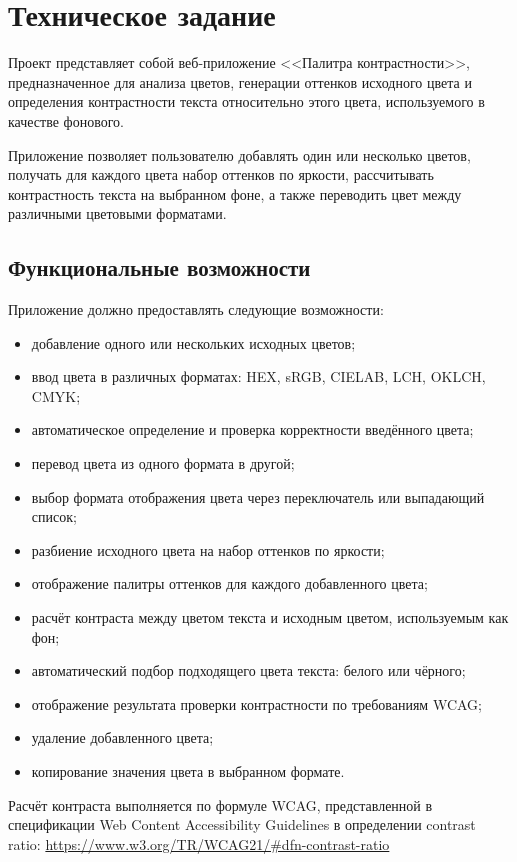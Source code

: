 \section{Техническое задание}

Проект представляет собой веб-приложение <<Палитра контрастности>>, предназначенное для анализа цветов, генерации оттенков исходного цвета и определения контрастности текста относительно этого цвета, используемого в качестве фонового.

Приложение позволяет пользователю добавлять один или несколько цветов, получать для каждого цвета набор оттенков по яркости, рассчитывать контрастность текста на выбранном фоне, а также переводить цвет между различными цветовыми форматами.

\subsection*{Функциональные возможности}

Приложение должно предоставлять следующие возможности:

\begin{itemize}
    \item добавление одного или нескольких исходных цветов;
    \item ввод цвета в различных форматах: HEX, sRGB, CIELAB, LCH, OKLCH, CMYK;
    \item автоматическое определение и проверка корректности введённого цвета;
    \item перевод цвета из одного формата в другой;
    \item выбор формата отображения цвета через переключатель или выпадающий список;
    \item разбиение исходного цвета на набор оттенков по яркости;
    \item отображение палитры оттенков для каждого добавленного цвета;
    \item расчёт контраста между цветом текста и исходным цветом, используемым как фон;
    \item автоматический подбор подходящего цвета текста: белого или чёрного;
    \item отображение результата проверки контрастности по требованиям WCAG;
    \item удаление добавленного цвета;
    \item копирование значения цвета в выбранном формате.
\end{itemize}

Расчёт контраста выполняется по формуле WCAG, представленной в спецификации Web Content Accessibility Guidelines в определении contrast ratio:
\url{https://www.w3.org/TR/WCAG21/#dfn-contrast-ratio}

